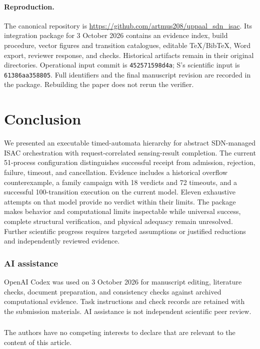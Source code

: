 \documentclass[runningheads]{llncs}
\newcommand{\code}[1]{\texttt{#1}}
\begin{document}
\paragraph{Reproduction.}
The canonical repository is \url{https://github.com/artmus208/uppaal_sdn_isac}. Its integration package for 3 October 2026 contains an evidence index, build procedure, vector figures and transition catalogues, editable TeX/BibTeX, Word export, reviewer response, and checks. Historical artifacts remain in their original directories. Operational input commit is \code{452571598d4a}; S's scientific input is \code{61386aa358805}. Full identifiers and the final manuscript revision are recorded in the package. Rebuilding the paper does not rerun the verifier.

\section{Conclusion}\label{sec:conclusion}
We presented an executable timed-automata hierarchy for abstract SDN-managed ISAC orchestration with request-correlated sensing-result completion. The current 51-process configuration distinguishes successful receipt from admission, rejection, failure, timeout, and cancellation. Evidence includes a historical overflow counterexample, a family campaign with 18 verdicts and 72 timeouts, and a successful 100-transition execution on the current model. Eleven exhaustive attempts on that model provide no verdict within their limits. The package makes behavior and computational limits inspectable while universal success, complete structural verification, and physical adequacy remain unresolved. Further scientific progress requires targeted assumptions or justified reductions and independently reviewed evidence.

\begin{credits}
\subsubsection{AI assistance} OpenAI Codex was used on 3 October 2026 for manuscript editing, literature checks, document preparation, and consistency checks against archived computational evidence. Task instructions and check records are retained with the submission materials. AI assistance is not independent scientific peer review.
\subsubsection{\discintname} The authors have no competing interests to declare that are relevant to the content of this article.
\end{credits}


\end{document}
